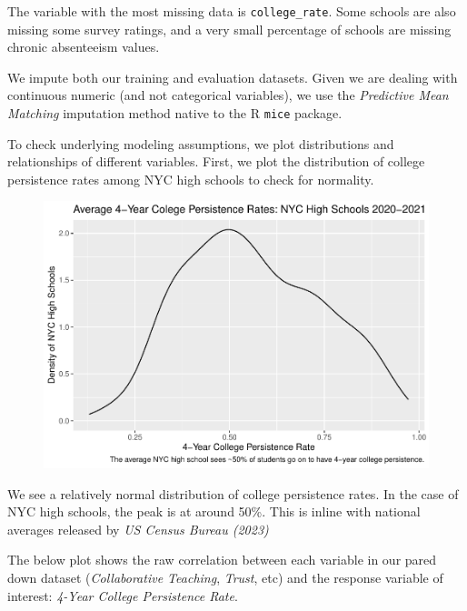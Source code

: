 \documentclass[
  man,floatsintext]{apa6}
\begin{document}
The variable with the most missing data is \texttt{college\_rate}. Some schools are also missing some survey ratings, and a very small percentage of schools are missing chronic absenteeism values.

We impute both our training and evaluation datasets. Given we are dealing with continuous numeric (and not categorical variables), we use the \emph{Predictive Mean Matching} imputation method native to the R \texttt{mice} package.

To check underlying modeling assumptions, we plot distributions and relationships of different variables. First, we plot the distribution of college persistence rates among NYC high schools to check for normality.

\begin{figure}[H]
\includegraphics[width=\textwidth]{final-project_files/figure-latex/unnamed-chunk-4-1} \caption{ }\label{fig:unnamed-chunk-4}
\end{figure}

We see a relatively normal distribution of college persistence rates. In the case of NYC high schools, the peak is at around 50\%. This is inline with national averages released by \emph{US Census Bureau (2023)}

The below plot shows the raw correlation between each variable in our pared down dataset (\emph{Collaborative Teaching}, \emph{Trust}, etc) and the response variable of interest: \emph{4-Year College Persistence Rate}.
\end{document}

